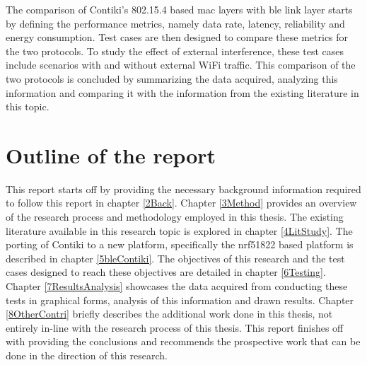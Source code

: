 The comparison of Contiki's 802.15.4 based \gls{mac} layers with \gls{ble} link layer starts by defining the performance metrics, namely data rate, latency, reliability and energy consumption. Test cases are then designed to compare these metrics for the two protocols. To study the effect of external interference, these test cases include scenarios with and without external WiFi traffic. This comparison of the two protocols is concluded by summarizing the data acquired, analyzing this information and comparing it with the information from the existing literature in this topic.



\section{Outline of the report}

This report starts off by providing the necessary background information required to follow this report in chapter \ref{2Back}. Chapter \ref{3Method} provides an overview of the research process and methodology employed in this thesis. The existing literature available in this research topic is explored in chapter \ref{4LitStudy}. The porting of Contiki to a new platform, specifically the nrf51822 based platform is described in chapter \ref{5bleContiki}. The objectives of this research and the test cases designed to reach these objectives are detailed in chapter \ref{6Testing}. Chapter \ref{7ResultsAnalysis} showcases the data acquired from conducting these tests in graphical forms, analysis of this information and drawn results. Chapter \ref{8OtherContri} briefly describes the additional work done in this thesis, not entirely in-line with the research process of this thesis. This report finishes off with providing the conclusions and recommends the prospective work that can be done in the direction of this research.

